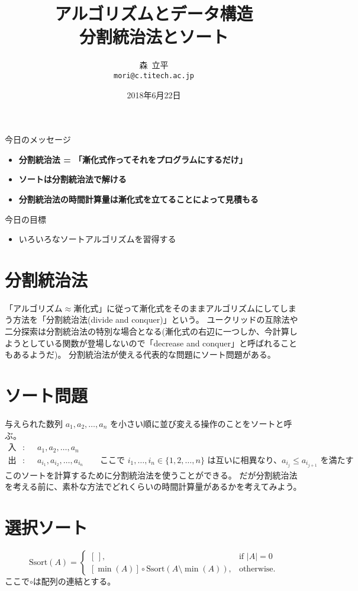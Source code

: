 \documentclass[a4paper,twoside,onecolumn,openany,article,10pt]{memoir}
\title{アルゴリズムとデータ構造\\\vspace{.5em} \Large 分割統治法とソート}
\date{2018年6月22日}
\author{森~立平\\ \texttt{mori@c.titech.ac.jp}}
\theoremstyle{remark}
\begin{document}
\maketitle


\noindent
今日のメッセージ
\begin{itemize}
\item \textbf{分割統治法 = 「漸化式作ってそれをプログラムにするだけ」}
\item \textbf{ソートは分割統治法で解ける}
\item \textbf{分割統治法の時間計算量は漸化式を立てることによって見積もる}
\end{itemize}

\noindent
今日の目標
\begin{itemize}
\item いろいろなソートアルゴリズムを習得する
\end{itemize}




\section{分割統治法}
「アルゴリズム$\approx$漸化式」に従って漸化式をそのままアルゴリズムにしてしまう方法を「分割統治法(divide and conquer)」という。
ユークリッドの互除法や二分探索は分割統治法の特別な場合となる(漸化式の右辺に一つしか、今計算しようとしている関数が登場しないので「decrease and conquer」と呼ばれることもあるようだ)。
分割統治法が使える代表的な問題にソート問題がある。
\section{ソート問題}
与えられた数列 $a_1, a_2,\dotsc, a_n$ を小さい順に並び変える操作のことをソートと呼ぶ。
\begin{align*}
\text{入力}:&\quad a_1, a_2,\dotsc, a_n\\
\text{出力}:&\quad a_{i_1}, a_{i_2}, \dotsc, a_{i_n} \qquad \text{ここで $i_1,\dotsc,i_n\in\{1,2,\dotsc,n\}$ は互いに相異なり、$a_{i_j}\le a_{i_{j+1}}$ を満たす}
\end{align*}
このソートを計算するために分割統治法を使うことができる。
だが分割統治法を考える前に、素朴な方法でどれくらいの時間計算量があるかを考えてみよう。

\section{選択ソート}
\begin{equation*}
\mathrm{Ssort}(A) =
\begin{cases}
[\,],&\text{if } |A| = 0\\
[\min(A)] \circ \mathrm{Ssort}(A\setminus \min(A)),& \text{otherwise.}
\end{cases}
\end{equation*}
ここで$\circ$は配列の連結とする。
\end{document}
